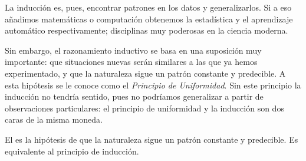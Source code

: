 La inducción es, pues, encontrar patrones en los datos y generalizarlos.
Si a eso añadimos matemáticas o computación obtenemos la estadística y el
aprendizaje automático respectivamente; disciplinas muy poderosas en la ciencia
moderna.

Sin embargo, el razonamiento inductivo se basa en una suposición muy importante:
que situaciones nuevas serán similares a las que ya hemos experimentado, y que
la naturaleza sigue un patrón constante y predecible.
A esta hipótesis se le conoce como el \emph{Principio de Uniformidad}.
Sin este principio la inducción no tendría sentido, pues no podríamos
generalizar a partir de observaciones particulares: el principio de uniformidad
y la inducción son dos caras de la misma moneda.

\begin{remember}
    \label{rem:principio de uniformidad}
    El  es la hipótesis de que la
    naturaleza sigue un patrón constante y predecible.
    Es equivalente al principio de inducción.
\end{remember}

